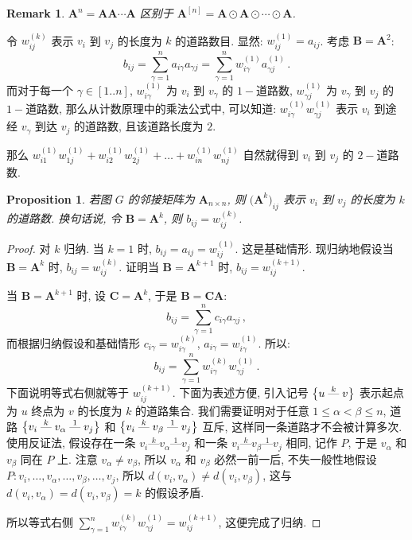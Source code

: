 \documentclass[UTF8]{ctexart}
\theoremstyle{mystyle}
\newtheorem{proposition}{Proposition}[section]
\theoremstyle{myremark}
\newtheorem*{remark}{Remark}
\theoremstyle{plain}
\newcommand{\ve}[1]{\boldsymbol{\mathbf{#1}}}
\DeclarePairedDelimiter\set{\{}{\}}
\newcommand{\connect}[1][]{\mathrel{\overset{#1}{\mbox{---}}}}
\begin{document}
\begin{remark}
    $ \ve A^n = \ve A \ve A \cdots \ve A $ 区别于 $ \ve A^{[n]} = \ve A \odot \ve A \odot \cdots \odot \ve A $.
\end{remark}

令 $ w_{ij}^{(k)} $ 表示 $ v_i $ 到 $ v_j $ 的长度为 $ k $ 的道路数目. 显然: $ w_{ij}^{(1)} = a_{ij} $. 考虑 $ \ve B = \ve A^2 $: 
\[ 
    b_{ij} = \sum_{\gamma = 1}^{n} a_{i\gamma} a_{\gamma j} = \sum_{\gamma = 1}^{n} w_{i \gamma}^{(1)} a_{\gamma j}^{(1)} \,.
\]
而对于每一个 $ \gamma \in [1..n] $, $ w_{i\gamma}^{(1)} $ 为 $ v_i $ 到 $ v_\gamma $ 的 $ 1- $道路数, $ w_{\gamma j}^{(1)} $ 为 $ v_{\gamma} $ 到 $ v_j $ 的 $ 1- $道路数, 那么从计数原理中的乘法公式中, 可以知道: $ w_{i \gamma}^{(1)} w_{\gamma j}^{(1)} $ 表示 $ v_i $ 到途经 $ v_{\gamma} $ 到达 $ v_j $ 的道路数, 且该道路长度为 $ 2 $.

那么 $ w_{i1}^{(1)} w_{1j}^{(1)} + w_{i2}^{(1)} w_{2j}^{(1)} + \dots + w_{in}^{(1)} w_{nj}^{(1)} $ 自然就得到 $ v_i $ 到 $ v_j $ 的 $ 2- $道路数.


\begin{proposition}
    若图 $ G $ 的邻接矩阵为 $ \ve A_{n \times n} $, 则 $\bigl( \ve A^k \bigr)_{ij} $ 表示 $ v_i $ 到 $ v_j $ 的长度为 $ k $ 的道路数. 换句话说, 令 $ \ve B = \ve A^k $, 则 $ b_{ij} = w_{ij}^{(k)} $.
\end{proposition}

\begin{proof}
    对 $ k $ 归纳. 当 $ k = 1 $ 时, $ b_{ij} = a_{ij} = w_{ij}^{(1)} $. 这是基础情形. 现归纳地假设当 $ \ve B = \ve A^k $ 时, $ b_{ij} = w_{ij}^{(k)} $. 证明当 $ \ve B = \ve A^{k + 1} $ 时, $ b_{ij} = w_{ij}^{(k + 1)} $.

    当 $ \ve B = \ve A^{k + 1} $ 时, 设 $ \ve C = \ve A^k $, 于是 $ \ve B = \ve C \ve A $:
    \[ 
        b_{ij} = \sum_{\gamma = 1}^{n} c_{i \gamma} a_{\gamma j} \,,
    \]
    而根据归纳假设和基础情形 $ c_{i \gamma} = w_{i \gamma}^{(k)} $, $ a_{i \gamma} = w_{i \gamma}^{(1)} $. 所以:
    \[ 
        b_{ij} = \sum_{\gamma = 1}^{n} w_{i \gamma}^{(k)} w_{\gamma j}^{(1)} \,.
    \]
    下面说明等式右侧就等于 $ w_{ij}^{(k + 1)} $. 下面为表述方便, 引入记号 $ \set[\big]{u \connect[k] v} $ 表示起点为 $ u $ 终点为 $ v $ 的长度为 $ k $ 的道路集合. 我们需要证明对于任意 $ 1 \leqslant \alpha < \beta \leqslant n $, 道路 $ \set[\big]{v_i \connect[k] v_\alpha \connect[1] v_j} $ 和 $ \set[\big]{v_i \connect[k] v_\beta \connect[1] v_j} $ 互斥, 这样同一条道路才不会被计算多次. 使用反证法, 假设存在一条 $ v_i \connect[k] v_\alpha \connect[1] v_j $ 和一条 $ v_i \connect[k] v_\beta \connect[1] v_j $ 相同, 记作 $ P $, 于是 $ v_\alpha $ 和 $ v_\beta $ 同在 $ P $ 上. 注意 $ v_\alpha \neq v_\beta $, 所以 $ v_\alpha $ 和 $ v_\beta $ 必然一前一后, 不失一般性地假设 $ P \colon v_i, \dots, v_\alpha, \dots, v_\beta, \dots, v_j $, 所以 $ d(v_i, v_\alpha) \neq d(v_i, v_\beta) $, 这与 $ d(v_i, v_\alpha) = d(v_i, v_\beta) = k $ 的假设矛盾.

    所以等式右侧 $ \sum\limits_{\gamma = 1}^{n} w_{i \gamma}^{(k)} w_{\gamma j}^{(1)} = w_{ij}^{(k + 1)} $, 这便完成了归纳.
\end{proof}
\end{document}
